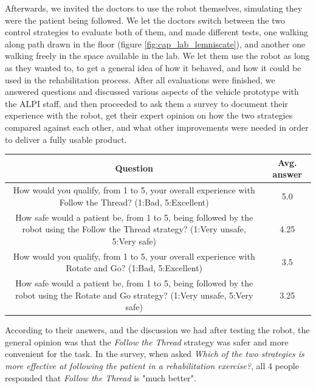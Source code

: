 \documentclass[journal]{IEEEtran}
\begin{document}
Afterwards, we invited the doctors to use the robot themselves, simulating they were the patient being followed. We let the doctors switch between the two control strategies to evaluate both of them, and made different tests, one walking along path drawn in the floor (figure \ref{fig:cap_lab_lemniscate}), and another one walking freely in the space available in the lab. We let them use the robot as long as they wanted to, to get a general idea of how it behaved, and how it could be used in the rehabilitation process. After all evaluations were finished, we answered questions and discussed various aspects of the vehicle prototype with the ALPI staff, and then proceeded to ask them a survey to document their experience with the robot, get their expert opinion on how the two strategies compared against each other, and what other improvements were needed in order to deliver a fully usable product. 

\begin{table}[t]
\begin{center}
\begin{tabular}[!t]{|c|c|}
\hline
Question & Avg. answer \\
\hline
How would you qualify, from 1 to 5, your overall experience with Follow the Thread? (1:Bad, 5:Excellent)  & 5.0\\
\hline
How safe would a patient be, from 1 to 5, being followed by the robot using the Follow the Thread strategy? (1:Very unsafe, 5:Very safe)  & 4.25\\
\hline
How would you qualify, from 1 to 5, your overall experience with Rotate and Go? (1:Bad, 5:Excellent)  & 3.5\\
\hline
How safe would a patient be, from 1 to 5, being followed by the robot using the Rotate and Go strategy? (1:Very unsafe, 5:Very safe) & 3.25\\
\hline
\end{tabular}
\label{tab:alpi_q_table_1}
\end{center}
\end{table}

According to their answers, and the discussion we had after testing the robot, the general opinion was that the \textit{Follow the Thread} strategy was safer and more convenient for the task. In the survey, when asked \textit{Which of the two strategies is more effective at following the patient in a rehabilitation exercise?}, all 4 people responded that \textit{Follow the Thread} is "much better".
\end{document}
